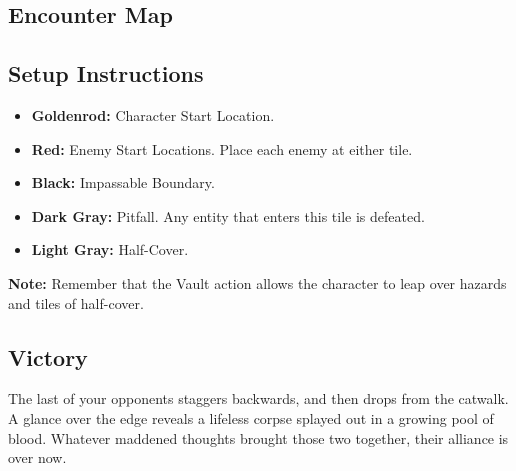 \subsection*{Encounter Map}
\begin{center}
\end{center}

\subsection*{Setup Instructions}
\begin{itemize}
\item \textbf{Goldenrod:} Character Start Location.
\item \textbf{Red:} Enemy Start Locations. Place each enemy at either tile.
\item \textbf{Black:} Impassable Boundary.
\item \textbf{Dark Gray:} Pitfall. Any entity that enters this tile is defeated.
\item \textbf{Light Gray:} Half-Cover.
\end{itemize}

\begin{tcolorbox}
\textbf{Note:} Remember that the Vault action allows the character to leap over hazards and tiles of half-cover.
\end{tcolorbox}

\pagebreak

\subsection*{Victory}
The last of your opponents staggers backwards, and then drops from the catwalk. A glance over the edge reveals a lifeless corpse splayed out in a growing pool of blood. Whatever maddened thoughts brought those two together, their alliance is over now.\\


